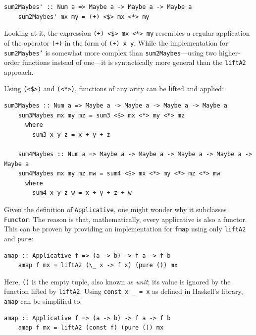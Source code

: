 \documentclass[UdineBachThesis,american,11pt]{PhdThesis}
\begin{document}
  \begin{Verbatim}[gobble=4,fontsize=\small]
    sum2Maybes' :: Num a => Maybe a -> Maybe a -> Maybe a
    sum2Maybes' mx my = (+) <$> mx <*> my
  \end{Verbatim}

  Looking at it, the expression \mbox{\texttt{(+) <\$> mx <*> my}} resembles a
  regular application of the operator \mbox{\texttt{(+)}} in the form of
  \mbox{\texttt{(+) x y}}. While the implementation for
  \mbox{\texttt{sum2Maybes'}} is somewhat more complex than
  \mbox{\texttt{sum2Maybes}}---using two higher-order functions instead of
  one---it is syntactically more general than the \mbox{\texttt{liftA2}}
  approach.

  Using \mbox{\texttt{(<\$>)}} and \mbox{\texttt{(<*>)}}, functions of any arity
  can be lifted and applied:

  \begin{Verbatim}[gobble=4,fontsize=\small]
    sum3Maybes :: Num a => Maybe a -> Maybe a -> Maybe a -> Maybe a
    sum3Maybes mx my mz = sum3 <$> mx <*> my <*> mz
      where
        sum3 x y z = x + y + z

    sum4Maybes :: Num a => Maybe a -> Maybe a -> Maybe a -> Maybe a -> Maybe a
    sum4Maybes mx my mz mw = sum4 <$> mx <*> my <*> mz <*> mw
      where
        sum4 x y z w = x + y + z + w
  \end{Verbatim}

  Given the definition of \mbox{\texttt{Applicative}}, one might wonder why it
  subclasses \mbox{\texttt{Functor}}. The reason is that, mathematically, every
  applicative is also a functor. This can be proven by providing an
  implementation for \mbox{\texttt{fmap}} using only \mbox{\texttt{liftA2}} and
  \mbox{\texttt{pure}}:

  \begin{Verbatim}[gobble=4,fontsize=\small]
    amap :: Applicative f => (a -> b) -> f a -> f b
    amap f mx = liftA2 (\_ x -> f x) (pure ()) mx
  \end{Verbatim}

  Here, \mbox{\texttt{()}} is the empty tuple, also known as \emph{unit}; its
  value is ignored by the function lifted by \mbox{\texttt{liftA2}}. Using
  \mbox{\texttt{const x \_ = x}} as defined in Haskell's library,
  \mbox{\texttt{amap}} can be simplified to:

  \begin{Verbatim}[gobble=4,fontsize=\small]
    amap :: Applicative f => (a -> b) -> f a -> f b
    amap f mx = liftA2 (const f) (pure ()) mx
  \end{Verbatim}
\end{document}
